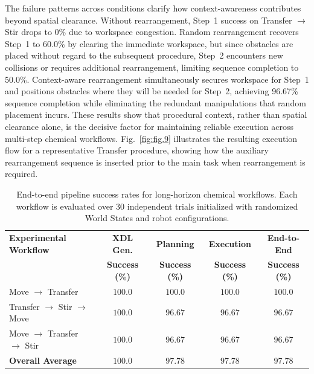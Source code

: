 \documentclass{ieeeaccess}
\begin{document}
The failure patterns across conditions clarify how context-awareness contributes beyond spatial clearance. Without rearrangement, Step~1 success on Transfer $\rightarrow$ Stir drops to 0\% due to workspace congestion. Random rearrangement recovers Step~1 to 60.0\% by clearing the immediate workspace, but since obstacles are placed without regard to the subsequent procedure, Step~2 encounters new collisions or requires additional rearrangement, limiting sequence completion to 50.0\%. Context-aware rearrangement simultaneously secures workspace for Step~1 and positions obstacles where they will be needed for Step~2, achieving 96.67\% sequence completion while eliminating the redundant manipulations that random placement incurs. These results show that procedural context, rather than spatial clearance alone, is the decisive factor for maintaining reliable execution across multi-step chemical workflows. Fig.~\ref{fig:fig.9} illustrates the resulting execution flow for a representative Transfer procedure, showing how the auxiliary rearrangement sequence is inserted prior to the main task when rearrangement is required.


\begin{table}[!t]
\centering
\caption{End-to-end pipeline success rates for long-horizon chemical workflows. Each workflow is evaluated over 30 independent trials initialized with randomized World States and robot configurations.}
\label{tab:end_to_end}
\begin{tabular*}{\linewidth}{@{\extracolsep{\fill}}lcccc@{}}
\toprule
\makecell{\textbf{Experimental} \\ \textbf{Workflow}} & \textbf{XDL Gen.} & \textbf{Planning} & \textbf{Execution} & \textbf{End-to-End} \\
 & \textbf{Success (\%)} & \textbf{Success (\%)} & \textbf{Success (\%)} & \textbf{Success (\%)} \\
\midrule
Move $\rightarrow$ Transfer & $100.0$ & $100.0$ & $100.0$ & $100.0$ \\
Transfer $\rightarrow$ Stir $\rightarrow$ Move & $100.0$ & $96.67$ & $96.67$ & $96.67$ \\
Move $\rightarrow$ Transfer $\rightarrow$ Stir & $100.0$ & $96.67$ & $96.67$ & $96.67$ \\
\midrule
\textbf{Overall Average} & $\mathbf{100.0}$ & $\mathbf{97.78}$ & $\mathbf{97.78}$ & $\mathbf{97.78}$ \\
\bottomrule
\end{tabular*}
\end{table}
\end{document}
